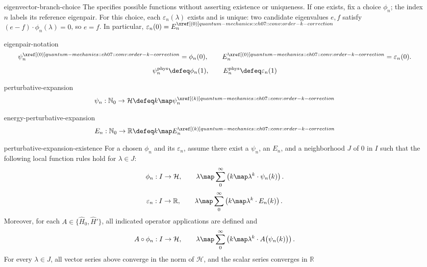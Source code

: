 \documentclass[12pt]{article}
\begin{document}
\begin{rem}{eigenvector-branch-choice}
  The  specifies possible functions without asserting existence or uniqueness. If one exists, fix a choice $\phi_n$; the index $n$ labels its reference eigenpair.
  For this choice, each $\varepsilon_n(\lambda)$ exists and is unique: two candidate eigenvalues $e,f$ satisfy $(e-f) \cdot \phi_n(\lambda) = 0$, so $e=f$. In particular, $\varepsilon_n(0) = E_n^{\porder{0}}$
\end{rem}

\begin{conv}{eigenpair-notation}
  \[
    \psi_n^{\porder{0}} = \phi_n(0),
    \qquad
    E_n^{\porder{0}} = \varepsilon_n(0).
  \]
  \[
    \psi_n^{\mathrm{phys}} \defeq \phi_n(1),
    \qquad
    E_n^{\mathrm{phys}} \defeq \varepsilon_n(1)
  \]
\end{conv}

\begin{dfn}{perturbative-expansion}
  \[
    \psi_n : \mathbb N_0 \to \mathcal H \defeq k \map \psi_n^{\porder{k}}
  \]
\end{dfn}

\begin{dfn}{energy-perturbative-expansion}
  \[
    E_n : \mathbb N_0 \to \mathbb R \defeq k \map E_n^{\porder{k}}
  \]
\end{dfn}

\begin{hypo}{perturbative-expansion-existence}
  For a chosen  $\phi_n$ and its  $\varepsilon_n$, assume there exist a  $\psi_n$, an  $E_n$, and a neighborhood $J$ of $0$ in $I$ such that the following local function rules hold for $\lambda \in J$:
  \[
    \phi_n : I \to \mathcal H,
    \qquad \lambda \map \sum_{0}^{\infty}\left(k \map \lambda^k \cdot \psi_n(k)\right).
  \]
  \[
    \varepsilon_n : I \to \mathbb R,
    \qquad \lambda \map \sum_{0}^{\infty}\left(k \map \lambda^k \cdot E_n(k)\right).
  \]
  Moreover, for each $A \in \{\hat H_0,\hat H'\}$, all indicated operator applications are defined and
  \[
    A\circ\phi_n : I \to \mathcal H,
    \qquad \lambda \map \sum_{0}^{\infty}\left(k \map \lambda^k \cdot A\bigl(\psi_n(k)\bigr)\right).
  \]
  For every $\lambda \in J$, all vector series above converge in the norm of $\mathcal H$, and the scalar series converges in $\mathbb R$
\end{hypo}
\end{document}
